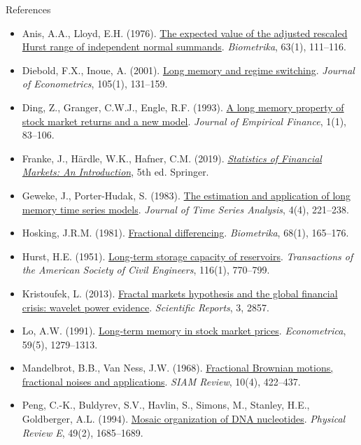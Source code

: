 \begin{frame}{References}
\itemsize{\tiny}
\begin{itemize}
    \item Anis, A.A., Lloyd, E.H. (1976). \href{https://doi.org/10.1093/biomet/63.1.111}{The expected value of the adjusted rescaled Hurst range of independent normal summands}. \textit{Biometrika}, 63(1), 111--116.
    \item Diebold, F.X., Inoue, A. (2001). \href{https://doi.org/10.1016/S0304-4076(01)00073-2}{Long memory and regime switching}. \textit{Journal of Econometrics}, 105(1), 131--159.
    \item Ding, Z., Granger, C.W.J., Engle, R.F. (1993). \href{https://doi.org/10.1016/0927-5398(93)90006-D}{A long memory property of stock market returns and a new model}. \textit{Journal of Empirical Finance}, 1(1), 83--106.
    \item Franke, J., Härdle, W.K., Hafner, C.M. (2019). \href{https://doi.org/10.1007/978-3-030-13751-9}{\textit{Statistics of Financial Markets: An Introduction}}, 5th ed. Springer.
    \item Geweke, J., Porter-Hudak, S. (1983). \href{https://doi.org/10.1111/j.1467-9892.1983.tb00371.x}{The estimation and application of long memory time series models}. \textit{Journal of Time Series Analysis}, 4(4), 221--238.
    \item Hosking, J.R.M. (1981). \href{https://doi.org/10.1093/biomet/68.1.165}{Fractional differencing}. \textit{Biometrika}, 68(1), 165--176.
    \item Hurst, H.E. (1951). \href{https://doi.org/10.1061/TACEAT.0006518}{Long-term storage capacity of reservoirs}. \textit{Transactions of the American Society of Civil Engineers}, 116(1), 770--799.
    \item Kristoufek, L. (2013). \href{https://doi.org/10.1038/srep02857}{Fractal markets hypothesis and the global financial crisis: wavelet power evidence}. \textit{Scientific Reports}, 3, 2857.
    \item Lo, A.W. (1991). \href{https://doi.org/10.2307/2938368}{Long-term memory in stock market prices}. \textit{Econometrica}, 59(5), 1279--1313.
    \item Mandelbrot, B.B., Van Ness, J.W. (1968). \href{https://doi.org/10.1137/1010093}{Fractional Brownian motions, fractional noises and applications}. \textit{SIAM Review}, 10(4), 422--437.
    \item Peng, C.-K., Buldyrev, S.V., Havlin, S., Simons, M., Stanley, H.E., Goldberger, A.L. (1994). \href{https://doi.org/10.1103/PhysRevE.49.1685}{Mosaic organization of DNA nucleotides}. \textit{Physical Review E}, 49(2), 1685--1689.

\end{itemize}
\end{frame}
